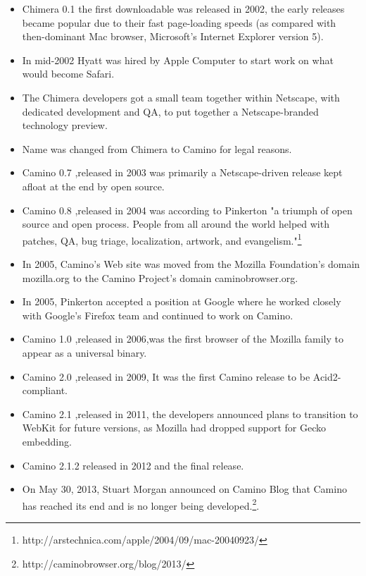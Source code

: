 \documentclass[11pt]{article} %
\begin{document}
  \begin{itemize}
  
 \item Chimera 0.1 the first downloadable was released in 2002, the early releases became popular due to their fast page-loading speeds (as compared with then-dominant Mac browser, Microsoft's Internet Explorer version 5).
 \item In mid-2002 Hyatt was hired by Apple Computer to start work on what would become Safari. 
 \item The Chimera developers got a small team together within Netscape, with dedicated development and QA, to put together a Netscape-branded technology preview.
 \item Name was changed from Chimera to Camino for legal reasons.
 \item Camino 0.7 ,released in 2003 was primarily a Netscape-driven release kept afloat at the end by open source.
  \item Camino 0.8 ,released in 2004 was according to Pinkerton "a triumph of open source and open process. People from all around the world helped with patches, QA, bug triage, localization, artwork, and evangelism."\footnote{http://arstechnica.com/apple/2004/09/mac-20040923/}\\
 \item In 2005, Camino's Web site was moved from the Mozilla Foundation's domain mozilla.org to the Camino Project's domain caminobrowser.org.
 \item In 2005, Pinkerton accepted a position at Google where he worked closely with Google's Firefox team and continued to work on Camino.
 \item Camino 1.0 ,released in 2006,was the first browser of the Mozilla family to appear as a universal binary.
 \item Camino 2.0 ,released in 2009, It was the first Camino release to be Acid2-compliant.
 \item Camino 2.1 ,released in 2011, the developers announced plans to transition to WebKit for future versions, as Mozilla had dropped support for Gecko embedding.
 \item Camino 2.1.2 released in 2012 and the final release.
\item On May 30, 2013, Stuart Morgan announced on Camino Blog that Camino has reached its end and is no longer being developed.\footnote{http://caminobrowser.org/blog/2013/}.
 \end{itemize}

\end{document}
